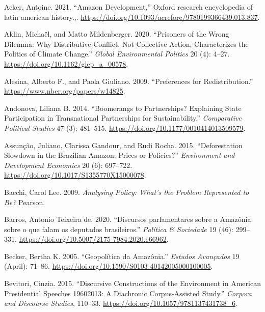\documentclass[
  12pt,
]{article}
\newlength{\cslhangindent}
\newlength{\cslentryspacingunit} %
\newenvironment{CSLReferences}[2] %
 {%
  \setlength{\parindent}{0pt}
  \ifodd #1
  \let\oldpar\par
  \def\par{\hangindent=\cslhangindent\oldpar}
  \fi
  \setlength{\parskip}{#2\cslentryspacingunit}
 }%
 {}
\begin{document}
\hypertarget{refs}{}
\begin{CSLReferences}{1}{0}
\leavevmode{}%
Acker, Antoine. 2021. {``Amazon Development,''} Oxford research
encyclopedia of latin american history.,.
\url{https://doi.org/10.1093/acrefore/9780199366439.013.837}.

\leavevmode{}%
Aklin, Michaël, and Matto Mildenberger. 2020. {``Prisoners of the Wrong
Dilemma: Why Distributive Conflict, Not Collective Action, Characterizes
the Politics of Climate Change.''} \emph{Global Environmental Politics}
20 (4): 4--27. \url{https://doi.org/10.1162/glep_a_00578}.

\leavevmode{}%
Alesina, Alberto F., and Paola Giuliano. 2009. {``Preferences for
Redistribution.''} \url{https://www.nber.org/papers/w14825}.

\leavevmode{}%
Andonova, Liliana B. 2014. {``Boomerangs to Partnerships? Explaining
State Participation in Transnational Partnerships for Sustainability.''}
\emph{Comparative Political Studies} 47 (3): 481--515.
\url{https://doi.org/10.1177/0010414013509579}.

\leavevmode{}%
Assunção, Juliano, Clarissa Gandour, and Rudi Rocha. 2015.
{``Deforestation Slowdown in the Brazilian Amazon: Prices or
Policies?''} \emph{Environment and Development Economics} 20 (6):
697--722. \url{https://doi.org/10.1017/S1355770X15000078}.

\leavevmode{}%
Bacchi, Carol Lee. 2009. \emph{Analysing Policy: What's the Problem
Represented to Be?} Pearson.

\leavevmode{}%
Barros, Antonio Teixeira de. 2020. {``Discursos parlamentares sobre a
Amazônia: sobre o que falam os deputados brasileiros.''} \emph{Política
\& Sociedade} 19 (46): 299--331.
\url{https://doi.org/10.5007/2175-7984.2020.e66962}.

\leavevmode{}%
Becker, Bertha K. 2005. {``Geopolítica da Amazônia.''} \emph{Estudos
Avançados} 19 (April): 71--86.
\url{https://doi.org/10.1590/S0103-40142005000100005}.

\leavevmode{}%
Bevitori, Cinzia. 2015. {``Discursive Constructions of the Environment
in American Presidential Speeches 1960{\textendash}2013: A Diachronic
Corpus-Assisted Study.''} \emph{Corpora and Discourse Studies}, 110--33.
\url{https://doi.org/10.1057/9781137431738_6}.


\end{CSLReferences}
\end{document}
